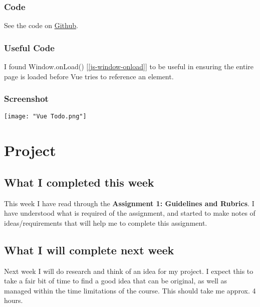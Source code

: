 \documentclass[12pt]{report}
\newcommand{\link}[2]{{\color{blue}\href{#1}{#2}}}
\begin{document}
				\subsubsection{Code}
				See the code on \link{https://github.com/BrandonMurch/SIT120/tree/main/Practical\%201/task4}{Github}.

				\subsubsection{Useful Code}
					I found Window.onLoad() [\ref{js-window-onload}] to be useful in ensuring the entire page is loaded before Vue tries to reference an element.
				\subsubsection{Screenshot}
				\texttt{[image: "Vue Todo.png"]}
		\section{Project}
			\subsection{What I completed this week}
				This week I have read through the \textbf{Assignment 1: Guidelines and Rubrics}. I have understood what is required of the assignment, and started to make notes of ideas/requirements that will help me to complete this assignment.
			\subsection{What I will complete next week}
				Next week I will do research and think of an idea for my project. I expect this to take a fair bit of time to find a good idea that can be original, as well as managed within the time limitations of the course. This should take me approx. 4 hours.

	\printbibliography
\end{document}

